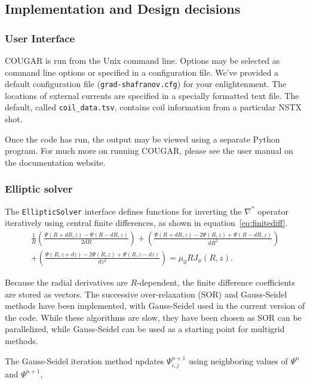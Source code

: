 \documentclass[paper=letter, fontsize=11pt]{scrartcl} %
\begin{document}
\restoregeometry

\subsection{Implementation and Design decisions}

\subsubsection{User Interface}
COUGAR is run from the Unix command line.  Options may be selected as command line options or specified in a configuration file.  We've provided a default configuration file (\texttt{grad-shafranov.cfg}) for your enlightenment.  The locations of external currents are specified in a specially formatted text file.  The default, called \texttt{coil\_data.tsv}, contains coil information from a particular NSTX shot.  

Once the code has run, the output may be viewed using a separate Python program. For much more on running COUGAR, please see the user manual on the documentation website.

\subsubsection{Elliptic solver}
The \texttt{EllipticSolver} interface defines functions for inverting the $\nabla^*$ operator iteratively using central finite differences, as shown in equation~\ref{eq:finitediff}.
\begin{multline} \label{eq:finitediff}
\frac{1}{R} \left(\frac{\Psi(R + dR, z) - \Psi(R - dR, z)}{2dR} \right) + \left( \frac{\Psi (R + dR, z) - 2\Psi(R,z) + \Psi(R-dR, z)}{dR^2} \right) \\ + \left(\frac{\Psi(R, z + dz) - 2\Psi(R,z)  + \Psi(R, z-dz)}{dz^2}\right) = \mu_0 R J_{\phi}(R,z). 
\end{multline}

Because the radial derivatives are $R$-dependent, the finite difference coefficients are stored as vectors. The successive over-relaxation (SOR) and Gauss-Seidel methods have been implemented, with Gauss-Seidel used in the current version of the code. While these algorithms are slow, they have been chosen as SOR can be parallelized, while Gauss-Seidel can be used as a starting point for multigrid methods. 

The Gauss-Seidel iteration method updates $\Psi^{n+1}_{i,j}$ using neighboring values of $\Psi^{n}$ and $\Psi^{n+1}$, 
\end{document}
